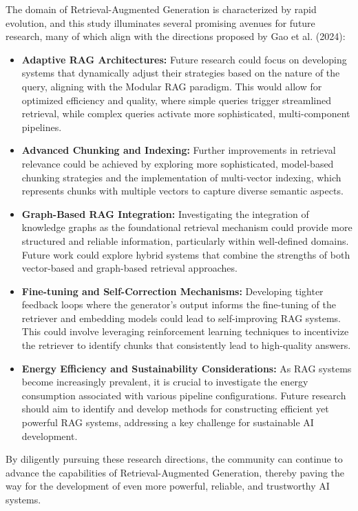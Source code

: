 The domain of Retrieval-Augmented Generation is characterized by rapid evolution, and this study illuminates several promising avenues for future research, many of which align with the directions proposed by Gao et al. (2024):
\begin{itemize}
    \item \textbf{Adaptive RAG Architectures:} Future research could focus on developing systems that dynamically adjust their strategies based on the nature of the query, aligning with the Modular RAG paradigm. This would allow for optimized efficiency and quality, where simple queries trigger streamlined retrieval, while complex queries activate more sophisticated, multi-component pipelines.
    \item \textbf{Advanced Chunking and Indexing:} Further improvements in retrieval relevance could be achieved by exploring more sophisticated, model-based chunking strategies and the implementation of multi-vector indexing, which represents chunks with multiple vectors to capture diverse semantic aspects.
    \item \textbf{Graph-Based RAG Integration:} Investigating the integration of knowledge graphs as the foundational retrieval mechanism could provide more structured and reliable information, particularly within well-defined domains. Future work could explore hybrid systems that combine the strengths of both vector-based and graph-based retrieval approaches.
    \item \textbf{Fine-tuning and Self-Correction Mechanisms:} Developing tighter feedback loops where the generator's output informs the fine-tuning of the retriever and embedding models could lead to self-improving RAG systems. This could involve leveraging reinforcement learning techniques to incentivize the retriever to identify chunks that consistently lead to high-quality answers.
    \item \textbf{Energy Efficiency and Sustainability Considerations:} As RAG systems become increasingly prevalent, it is crucial to investigate the energy consumption associated with various pipeline configurations. Future research should aim to identify and develop methods for constructing efficient yet powerful RAG systems, addressing a key challenge for sustainable AI development.
\end{itemize}

By diligently pursuing these research directions, the community can continue to advance the capabilities of Retrieval-Augmented Generation, thereby paving the way for the development of even more powerful, reliable, and trustworthy AI systems.